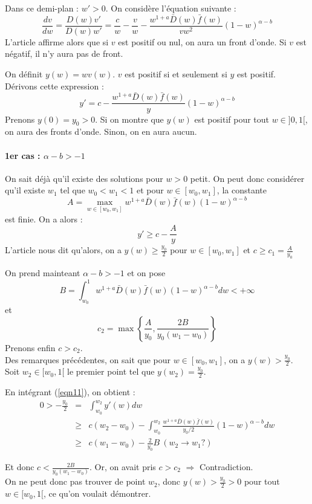 \documentclass{article}
\begin{document}
Dans ce demi-plan : $w'>0$. On considère l'équation suivante : 
\[\frac{dv}{dw} = \frac{D(w)v'}{D(w)w'}=\frac{c}{w}-\frac{v}{w}-\frac{w^{1+a}\bar{D}(w)\bar{f}(w)}{vw^2}(1-w)^{\alpha-b}\]
L'article affirme alors que si $v$ est positif ou nul, on aura un front d'onde. Si $v$ est négatif, il n'y aura pas de front. 

\bigskip
On définit $y(w)=wv(w)$. $v$ est positif si et seulement si $y$ est positif. Dérivons cette expression : 
\begin{equation} \label{eqn11} y'=c-\frac{w^{1+a}\bar{D}(w)\bar{f}(w)}{y}(1-w)^{\alpha-b}\end{equation}
Prenons $y(0)=y_0>0$. Si on montre que $y(w)$ est positif pour tout $w\in]0,1[$, on aura des fronts d'onde. Sinon, on en aura aucun.

\paragraph{1er cas : $\alpha-b>-1$}
On sait déjà qu'il existe des solutions pour $w>0$ petit. On peut donc considérer qu'il existe $w_1$ tel que $w_0<w_1<1$ et pour $w\in[w_0,w_1]$, la constante 
\[A=\max_{w\in[w_0,w_1]}w^{1+a}\bar{D}(w)\bar{f}(w)(1-w)^{\alpha-b}\]
est finie. On a alors : \[y'\geq c-\frac{A}{y}\]
L'article nous dit qu'alors, on a $y(w)\geq \frac{y_0}{2}$ pour $w\in[w_0,w_1]$ et $c\geq c_1=\frac{A}{y_0}$

\bigskip
On prend mainteant $\alpha-b>-1$ et on pose \[B=\int_{w_0}^1 w^{1+a}\bar{D}(w)\bar{f}(w)(1-w)^{\alpha-b}dw<+\infty\]
et \[c_2=\max \left\{\frac{A}{y_0}, \frac{2B}{y_0(w_1-w_0)}\right\}\]
Prenons enfin $c>c_2$.\\
Des remarques précédentes, on sait que pour $w\in[w_0,w_1]$, on a $y(w)>\frac{y_0}{2}$. Soit $w_2\in[w_0,1[$ le premier point tel que $y(w_2)=\frac{y_0}{2}$. 

En intégrant (\ref{eqn11}), on obtient : 
\begin{eqnarray*}
	0>-\frac{y_0}{2}&=&\int_{w_0}^{w_2} y'(w)dw\\
			&\geq& c(w_2-w_0) - \int_{w_0}^{w_2} \frac{w^{1+a}\bar{D}(w)\bar{f}(w)}{y_0/2}(1-w)^{\alpha-b} dw\\
			&\geq& c(w_1-w_0) - \frac{2}{y_0} B\ (w_2\rightarrow w_1 ?)
\end{eqnarray*}

Et donc $c<\frac{2B}{y_0(w_1-w_0)}$. Or, on avait pris $c>c_2$ $\Rightarrow$ Contradiction. \\
On ne peut donc pas trouver de point $w_2$, donc $y(w)>\frac{y_0}{2}>0$ pour tout $w\in[w_0,1[$, ce qu'on voulait démontrer.
\end{document}
